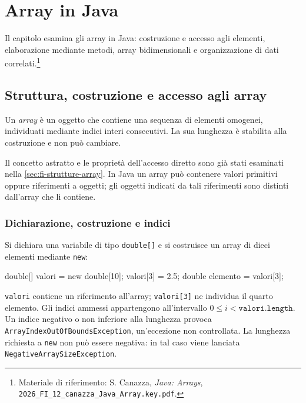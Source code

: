 \chapter{Array in Java}
\label{chap:array-java}

Il capitolo esamina gli array in Java: costruzione e accesso agli
elementi, elaborazione mediante metodi, array bidimensionali e
organizzazione di dati correlati.\footnote{Materiale
di riferimento: S. Canazza, \emph{Java: Arrays},
\nolinkurl{2026_FI_12_canazza_Java_Array.key.pdf}.}

\section{Struttura, costruzione e accesso agli array}
\label{sec:fi-java-array-fondamenti}

\begin{definition}
\label{def:fi-java-array}
Un \emph{array} è un oggetto che contiene una sequenza di elementi
omogenei, individuati mediante indici interi consecutivi.
La sua lunghezza è stabilita alla costruzione e non può cambiare.
\end{definition}

Il concetto astratto e le proprietà dell'accesso diretto sono già
stati esaminati nella \cref{sec:fi-strutture-array}.
In Java un array può contenere valori primitivi oppure riferimenti
a oggetti; gli oggetti indicati da tali riferimenti sono distinti
dall'array che li contiene.

\subsection{Dichiarazione, costruzione e indici}
\label{sec:fi-java-array-costruzione}

Si dichiara una variabile di tipo \texttt{double[]} e si costruisce
un array di dieci elementi mediante \texttt{new}:

\begin{unipdcode}[language=Java]
double[] valori = new double[10];
valori[3] = 2.5;
double elemento = valori[3];
\end{unipdcode}

\texttt{valori} contiene un riferimento all'array;
\texttt{valori[3]} ne individua il quarto elemento. Gli indici
ammessi appartengono all'intervallo
\(0\le i<\texttt{valori.length}\). Un indice negativo o non inferiore
alla lunghezza provoca \texttt{ArrayIndexOutOfBoundsException},
un'eccezione non controllata.
La lunghezza richiesta a \texttt{new} non può essere negativa:
in tal caso viene lanciata \texttt{NegativeArraySizeException}.

